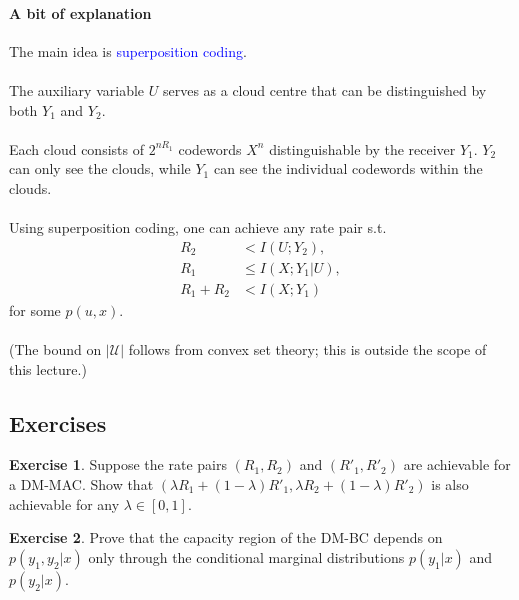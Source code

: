 \documentclass[a4paper, 11pt, openany]{book}
\numberwithin{equation}{section}
\theoremstyle{plain}
\theoremstyle{definition}
\newtheorem{exercise}   {Exercise}  [section]
\newcommand{\Structure}[1]{\textcolor{blue}{#1}}
\newcommand{\alphabet}[1]{\mathcal{#1}}
\begin{document}
\paragraph{A bit of explanation}
The main idea is \Structure{superposition coding}.\\
~\\
The auxiliary variable $U$ serves as a cloud centre that can be distinguished by both $Y_1$ and $Y_2$.\\
~\\
Each cloud consists of $2^{nR_1}$ codewords $X^n$ distinguishable by the receiver $Y_1$.
$Y_2$ can only see the clouds, while $Y_1$ can see the individual codewords within the clouds.\\
~\\
Using superposition coding, one can achieve any rate pair s.t.
\begin{align*}
	R_2 &< I(U; Y_2),\\
	R_1 &\le I(X; Y_1 | U),\\
	R_1 + R_2 &< I(X; Y_1)
\end{align*}
for some $p(u,x)$.\\
~\\
(The bound on $|\alphabet{U}|$ follows from convex set theory; this is outside the scope of this lecture.)


\subsection{Exercises}



\begin{exercise}
Suppose the rate pairs $(R_1,R_2)$ and $(R'_1,R'_2)$ are achievable for a DM-MAC. Show that $(\lambda R_1 + (1- \lambda)R'_1, \lambda R_2 + (1- \lambda)R'_2)$ is also achievable for any $\lambda \in [0,1]$.
\end{exercise}



\begin{exercise}
Prove that the capacity region of the DM-BC depends on $p(y_1, y_2|x)$ only through the conditional marginal distributions $p(y_1|x)$ and $p(y_2|x)$.
\end{exercise}
\end{document}
